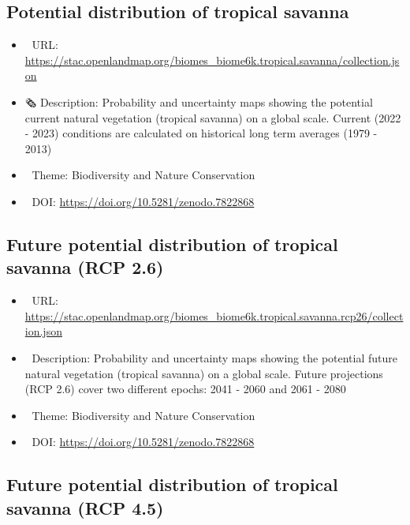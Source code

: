 \documentclass[
  graybox,natbib,nospthms]{svmono}
\providecommand{\tightlist}{%
  \setlength{\itemsep}{0pt}\setlength{\parskip}{0pt}}
\providecommand{\tightlist}{\setlength{\itemsep}{0pt}\setlength{\parskip}{0pt}}
\begin{document}
\hypertarget{potential-distribution-of-tropical-savanna}{%
\subsection{Potential distribution of tropical savanna}\label{potential-distribution-of-tropical-savanna}}

\begin{itemize}
\tightlist
\item
  🔗 URL: \url{https://stac.openlandmap.org/biomes_biome6k.tropical.savanna/collection.json}
\item
  🗞 Description: Probability and uncertainty maps showing the potential current natural vegetation (tropical savanna) on a global scale. Current (2022 - 2023) conditions are calculated on historical long term averages (1979 - 2013)
\item
  📝 Theme: Biodiversity and Nature Conservation
\item
  📂 DOI: \url{https://doi.org/10.5281/zenodo.7822868}
\end{itemize}

\hypertarget{future-potential-distribution-of-tropical-savanna-rcp-2.6}{%
\subsection{Future potential distribution of tropical savanna (RCP 2.6)}\label{future-potential-distribution-of-tropical-savanna-rcp-2.6}}

\begin{itemize}
\tightlist
\item
  🔗 URL: \url{https://stac.openlandmap.org/biomes_biome6k.tropical.savanna.rcp26/collection.json}
\item
  📰 Description: Probability and uncertainty maps showing the potential future natural vegetation (tropical savanna) on a global scale. Future projections (RCP 2.6) cover two different epochs: 2041 - 2060 and 2061 - 2080
\item
  📝 Theme: Biodiversity and Nature Conservation
\item
  📂 DOI: \url{https://doi.org/10.5281/zenodo.7822868}
\end{itemize}

\hypertarget{future-potential-distribution-of-tropical-savanna-rcp-4.5}{%
\subsection{Future potential distribution of tropical savanna (RCP 4.5)}\label{future-potential-distribution-of-tropical-savanna-rcp-4.5}}
\end{document}
